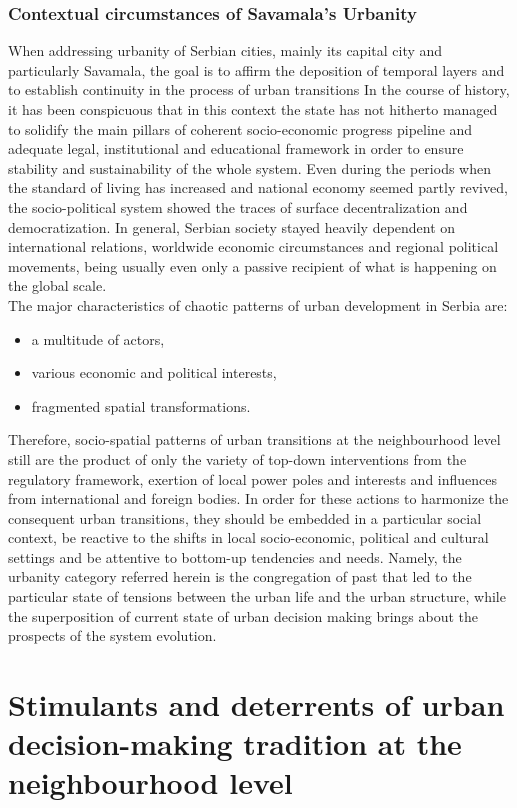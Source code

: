 \documentclass[11pt]{report}
\begin{document}
\subsubsection{Contextual circumstances of Savamala's Urbanity}
When addressing urbanity of Serbian cities, mainly its capital city and particularly Savamala, the goal is to affirm the deposition of temporal layers and to establish continuity in the process of urban transitions \cite{(Grozdanic 2008)}
In the course of history, it has been conspicuous that in this context the state has not hitherto managed to solidify the main pillars of coherent socio-economic progress pipeline and adequate legal, institutional and educational framework in order to ensure stability and sustainability of the whole system. Even during the periods when the standard of living has increased and national economy seemed partly revived, the socio-political system showed the traces of surface decentralization and democratization. In general, Serbian society stayed heavily dependent on international relations, worldwide economic circumstances and regional political movements, being usually even only a passive recipient of what is happening on the global scale.
\\
The major characteristics of chaotic patterns of urban development in Serbia are:
\begin{itemize}
\item a multitude of actors,
\item various economic and political interests,
\item fragmented spatial transformations.
\end{itemize}

Therefore, socio-spatial patterns of urban transitions at the neighbourhood level still are the product of only the variety of top-down interventions from the regulatory framework, exertion of local power poles and interests and influences from international and foreign bodies. In order for these actions to harmonize the consequent urban transitions, they should be embedded in a particular social context, be reactive to the shifts in local socio-economic, political and cultural settings and be attentive to bottom-up tendencies and needs. Namely, the urbanity category referred herein is the congregation of past that led to the particular state of tensions between the urban life and the urban structure, while the superposition of current state of urban decision making brings about the prospects of the system evolution.

\section{Stimulants and deterrents of urban decision-making tradition at the neighbourhood level}
\end{document}

